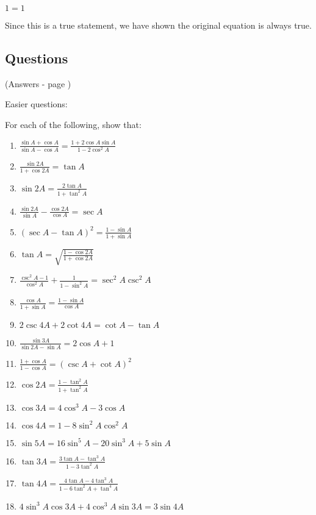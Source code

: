 \documentclass[../main.tex]{subfiles}
\begin{document}
$1=1$

Since this is a true statement, we have shown the original equation is always true.

\pagebreak

\subsection*{Questions} 
\label{Trig identities}
(Answers - page {\pageref{Trig identities answers}})

Easier questions:

For each of the following, show that:
\begin{enumerate}
    \item $\frac{\sin{A}+\cos{A}}{\sin{A}-\cos{A}}=\frac{1+2\cos{A}\sin{A}}{1-2\cos^2{A}}$
    
    \item $\frac{\sin{2A}}{1+\cos{2A}}=\tan{A}$
    
    \item $\sin{2A}=\frac{2\tan{A}}{1+\tan^2{A}}$
    
    \item $\frac{\sin{2A}}{\sin{A}}-\frac{\cos{2A}}{\cos{A}}=\sec{A}$
    
    \item $(\sec{A}-\tan{A})^2=\frac{1-\sin{A}}{1+\sin{A}}$
    
    \item $\tan{A}=\sqrt{\frac{1-\cos{2A}}{1+\cos{2A}}}$

    \item $\frac{\csc^2{A}-1}{\cos^2{A}}+\frac{1}{1-\sin^2{A}}=\sec^2{A}\csc^2{A}$
    
    \item $\frac{\cos{A}}{1+\sin{A}}=\frac{1-\sin{A}}{\cos{A}}$
    
    \item $2\csc{4A}+2\cot{4A}=\cot{A}-\tan{A}$
    
    \item $\frac{\sin{3A}}{\sin{2A}-\sin{A}}=2\cos{A}+1$
    
    \item $\frac{1+\cos{A}}{1-\cos{A}}=(\csc{A}+\cot{A})^2$
    
    \item $\cos{2A}=\frac{1-\tan^2{A}}{1+\tan^2{A}}$
    
    \item $\cos{3A}=4\cos^3{A}-3\cos{A}$
    
    \item $\cos{4A}=1-8\sin^2{A}\cos^2{A}$
    
    \item $\sin{5A}=16\sin^5{A}-20\sin^3{A}+5\sin{A}$
    
    \item $\tan{3A}=\frac{3\tan{A}-\tan^3{A}}{1-3\tan^2{A}}$
    
    \item $\tan{4A}=\frac{4\tan{A}-4\tan^3{A}}{1-6\tan^2{A}+\tan^4{A}}$
    
    \item $4\sin^3{A}\cos{3A}+4\cos^3{A}\sin{3A}=3\sin{4A}$


\end{enumerate}
\end{document}
